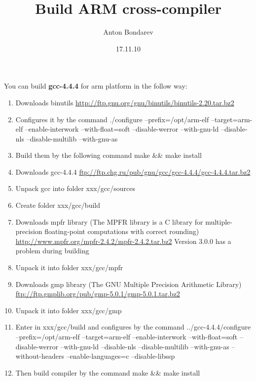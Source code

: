 \documentclass[12pt]{article}
\title{Build ARM cross-compiler}
\date{17.11.10}
\author{Anton Bondarev}
\begin{document}
You can build \textbf{gcc-4.4.4} for arm platform in the follow way:
\begin{enumerate} 
\item Downloads binutils 
    \href{url}{http://ftp.gnu.org/gnu/binutils/binutils-2.20.tar.bz2}
\item Configures it by the command 
    ./configure --prefix=/opt/arm-elf --target=arm-elf --enable-interwork --with-float=soft --disable-werror --with-gnu-ld --disable-nls --disable-multilib --with-gnu-as
\item Build them by the following command 
    make \&\& make install
\item  Downloads gcc-4.4.4 
    \href{url}{ftp://ftp.chg.ru/pub/gnu/gcc/gcc-4.4.4/gcc-4.4.4.tar.bz2}
\item Unpack gcc into folder xxx/gcc/sources
\item Create folder xxx/gcc/build
\item Downloads mpfr library (The MPFR library is a C library for multiple-precision floating-point computations with correct rounding)
    \href{url}{http://www.mpfr.org/mpfr-2.4.2/mpfr-2.4.2.tar.bz2}
    Version 3.0.0 has a problem during building
\item Unpack it into folder xxx/gcc/mpfr
\item Downloads gmp library (The GNU Multiple Precision Arithmetic Library)
    \href{url}{ftp://ftp.gmplib.org/pub/gmp-5.0.1/gmp-5.0.1.tar.bz2}
\item Unpack it into folder xxx/gcc/gmp
\item Enter in xxx/gcc/build and configures by the command
    ../gcc-4.4.4/configure --prefix=/opt/arm-elf --target=arm-elf --enable-interwork --with-float=soft --disable-werror --with-gnu-ld --disable-nls --disable-multilib --with-gnu-as --without-headers --enable-languages=c --disable-libssp
\item Then build compiler by the command
    make \&\& make install
\end{enumerate}
\end{document}

